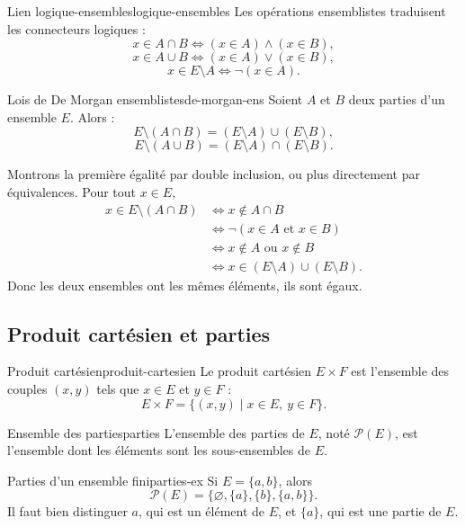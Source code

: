 \documentclass[11pt,a4paper]{article}
\newcommand{\calP}{\mathcal{P}}
\begin{document}
\begin{propositionbox}{Lien logique-ensembles}{logique-ensembles}
Les opérations ensemblistes traduisent les connecteurs logiques :
\[
x\in A\cap B \Longleftrightarrow (x\in A)\land(x\in B),
\]
\[
x\in A\cup B \Longleftrightarrow (x\in A)\lor(x\in B),
\]
\[
x\in E\setminus A \Longleftrightarrow \neg(x\in A).
\]
\end{propositionbox}

\begin{theorembox}{Lois de De Morgan ensemblistes}{de-morgan-ens}
Soient $A$ et $B$ deux parties d'un ensemble $E$. Alors :
\[
E\setminus(A\cap B)=(E\setminus A)\cup(E\setminus B),
\]
\[
E\setminus(A\cup B)=(E\setminus A)\cap(E\setminus B).
\]
\end{theorembox}

\begin{preuvebox}
Montrons la première égalité par double inclusion, ou plus directement par équivalences. Pour tout $x\in E$,
\begin{align*}
x\in E\setminus(A\cap B)
&\Longleftrightarrow x\notin A\cap B\\
&\Longleftrightarrow \neg(x\in A\text{ et }x\in B)\\
&\Longleftrightarrow x\notin A\text{ ou }x\notin B\\
&\Longleftrightarrow x\in(E\setminus A)\cup(E\setminus B).
\end{align*}
Donc les deux ensembles ont les mêmes éléments, ils sont égaux.
\end{preuvebox}

\subsection{Produit cartésien et parties}

\begin{definitionbox}{Produit cartésien}{produit-cartesien}
Le produit cartésien $E\times F$ est l'ensemble des couples $(x,y)$ tels que $x\in E$ et $y\in F$ :
\[
E\times F=\{(x,y)\mid x\in E,\ y\in F\}.
\]
\end{definitionbox}

\begin{definitionbox}{Ensemble des parties}{parties}
L'ensemble des parties de $E$, noté $\calP(E)$, est l'ensemble dont les éléments sont les sous-ensembles de $E$.
\end{definitionbox}

\begin{exemplebox}{Parties d'un ensemble fini}{parties-ex}
Si $E=\{a,b\}$, alors
\[
\calP(E)=\{\varnothing,\{a\},\{b\},\{a,b\}\}.
\]
Il faut bien distinguer $a$, qui est un élément de $E$, et $\{a\}$, qui est une partie de $E$.
\end{exemplebox}
\end{document}
